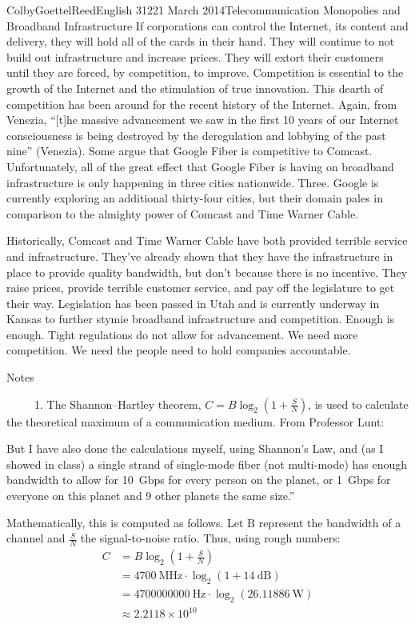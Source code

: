 \documentclass[12pt]{article}
\begin{document}
\begin{mla}{Colby}{Goettel}{Reed}{English 312}{21 March 2014}{Telecommunication Monopolies and Broadband Infrastructure}
If corporations can control the Internet, its content and delivery, they will hold all of the cards in their hand. They will continue to not build out infrastructure and increase prices. They will extort their customers until they are forced, by competition, to improve. Competition is essential to the growth of the Internet and the stimulation of true innovation. This dearth of competition has been around for the recent history of the Internet. Again, from Venezia, ``[t]he massive advancement we saw in the first 10 years of our Internet consciousness is being destroyed by the deregulation and lobbying of the past nine'' (Venezia). Some argue that Google Fiber is competitive to Comcast. Unfortunately, all of the great effect that Google Fiber is having on broadband infrastructure is only happening in three cities nationwide. Three. Google is currently exploring an additional thirty-four cities, but their domain pales in comparison to the almighty power of Comcast and Time Warner Cable.

Historically, Comcast and Time Warner Cable have both provided terrible service and infrastructure. They've already shown that they have the infrastructure in place to provide quality bandwidth, but don't because there is no incentive. They raise prices, provide terrible customer service, and pay off the legislature to get their way. Legislation has been passed in Utah and is currently underway in Kansas to further stymie broadband infrastructure and competition. Enough is enough. Tight regulations do not allow for advancement. We need more competition. We need the people need to hold companies accountable.

\newpage
\begin{center}
    Notes
\end{center}
\ \ \ \ \ 1. The Shannon--Hartley theorem, $C=B\log_2\left(1+\frac{S}{N}\right)$, is used to calculate the theoretical maximum of a communication medium. From Professor Lunt:
\begin{mlaquote}
    But I have also done the calculations myself, using Shannon's Law, and (as I showed in class) a single strand of single-mode fiber (not multi-mode) has enough bandwidth to allow for 10~Gbps for every person on the planet, or 1~Gbps for everyone on this planet and 9 other planets the same size.''
\end{mlaquote}

Mathematically, this is computed as follows. Let B represent the bandwidth of a channel and $\frac{S}{N}$ the signal-to-noise ratio. Thus, using rough numbers:
\begin{align*}
    C&=B\log_2\left(1+\frac{S}{N}\right) \\
     &=4700~\text{MHz}\cdot\log_2\left(1+14~\text{dB}\right) \\
     &=4700000000~\text{Hz}\cdot\log_2(26.11886~\text{W}) \\
     &\approx2.2118\times10^{10}
\end{align*}


\end{mla}
\end{document}
